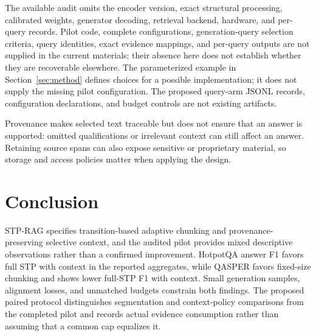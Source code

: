 \documentclass[10pt]{article}
\begin{document}
The available audit omits the encoder version, exact structural processing, calibrated weights, generator decoding, retrieval backend, hardware, and per-query records. Pilot code, complete configurations, generation-query selection criteria, query identities, exact evidence mappings, and per-query outputs are not supplied in the current materials; their absence here does not establish whether they are recoverable elsewhere. The parameterized example in Section~\ref{sec:method} defines choices for a possible implementation; it does not supply the missing pilot configuration. The proposed query-arm JSONL records, configuration declarations, and budget controls are not existing artifacts.

Provenance makes selected text traceable but does not ensure that an answer is supported: omitted qualifications or irrelevant context can still affect an answer. Retaining source spans can also expose sensitive or proprietary material, so storage and access policies matter when applying the design.

\section{Conclusion}

STP-RAG specifies transition-based adaptive chunking and provenance-preserving selective context, and the audited pilot provides mixed descriptive observations rather than a confirmed improvement. HotpotQA answer F1 favors full STP with context in the reported aggregates, while QASPER favors fixed-size chunking and shows lower full-STP F1 with context. Small generation samples, alignment losses, and unmatched budgets constrain both findings. The proposed paired protocol distinguishes segmentation and context-policy comparisons from the completed pilot and records actual evidence consumption rather than assuming that a common cap equalizes it.
\end{document}
